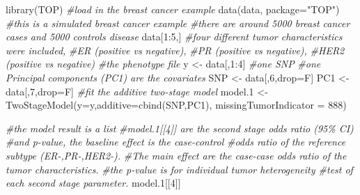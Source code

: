 \documentclass[11pt,]{article}
\newenvironment{Shaded}{\begin{snugshade}}{\end{snugshade}}
\newcommand{\AttributeTok}[1]{\textcolor[rgb]{0.77,0.63,0.00}{#1}}
\newcommand{\CommentTok}[1]{\textcolor[rgb]{0.56,0.35,0.01}{\textit{#1}}}
\newcommand{\DecValTok}[1]{\textcolor[rgb]{0.00,0.00,0.81}{#1}}
\newcommand{\FloatTok}[1]{\textcolor[rgb]{0.00,0.00,0.81}{#1}}
\newcommand{\FunctionTok}[1]{\textcolor[rgb]{0.00,0.00,0.00}{#1}}
\newcommand{\NormalTok}[1]{#1}
\newcommand{\OtherTok}[1]{\textcolor[rgb]{0.56,0.35,0.01}{#1}}
\newcommand{\SpecialCharTok}[1]{\textcolor[rgb]{0.00,0.00,0.00}{#1}}
\newcommand{\StringTok}[1]{\textcolor[rgb]{0.31,0.60,0.02}{#1}}
\begin{document}
\begin{Shaded}
\begin{Highlighting}[]
\FunctionTok{library}\NormalTok{(TOP)}
\CommentTok{\#load in the breast cancer example}
\FunctionTok{data}\NormalTok{(data, }\AttributeTok{package=}\StringTok{"TOP"}\NormalTok{)}
\CommentTok{\#this is a simulated breast cancer example}
\CommentTok{\#there are around 5000 breast cancer cases and 5000 controls disease}
\NormalTok{data[}\DecValTok{1}\SpecialCharTok{:}\DecValTok{5}\NormalTok{,]}
\CommentTok{\#four different tumor characteristics were included, }
\CommentTok{\#ER (positive vs negative), }
\CommentTok{\#PR (positive vs negative),}
\CommentTok{\#HER2 (positive vs negative)}
\CommentTok{\#the phenotype file}
\NormalTok{y }\OtherTok{\textless{}{-}}\NormalTok{ data[,}\DecValTok{1}\SpecialCharTok{:}\DecValTok{4}\NormalTok{]}
\CommentTok{\#one SNP}
\CommentTok{\#one Principal components (PC1) are the covariates}
\NormalTok{SNP }\OtherTok{\textless{}{-}}\NormalTok{ data[,}\DecValTok{6}\NormalTok{,drop}\OtherTok{=}\NormalTok{F]}
\NormalTok{PC1 }\OtherTok{\textless{}{-}}\NormalTok{ data[,}\DecValTok{7}\NormalTok{,drop}\OtherTok{=}\NormalTok{F]}
\CommentTok{\#fit the additive two{-}stage model}
\NormalTok{model}\FloatTok{.1} \OtherTok{\textless{}{-}} \FunctionTok{TwoStageModel}\NormalTok{(}\AttributeTok{y=}\NormalTok{y,}\AttributeTok{additive=}\FunctionTok{cbind}\NormalTok{(SNP,PC1),}
                         \AttributeTok{missingTumorIndicator =} \DecValTok{888}\NormalTok{)}
\end{Highlighting}
\end{Shaded}

\begin{Shaded}
\begin{Highlighting}[]
\CommentTok{\#the model result is a list}
\CommentTok{\#model.1[[4]] are the second stage odds ratio (95\% CI) }
\CommentTok{\#and p{-}value, the baseline effect is the case{-}control }
\CommentTok{\#odds ratio of the reference subtype (ER{-},PR{-},HER2{-}). }
\CommentTok{\#The main effect are the case{-}case odds ratio of the tumor characteristics.}
\CommentTok{\#the p{-}value is for individual tumor heterogeneity \#test of each second stage parameter. }
\NormalTok{model}\FloatTok{.1}\NormalTok{[[}\DecValTok{4}\NormalTok{]]}
\end{Highlighting}
\end{Shaded}
\end{document}
